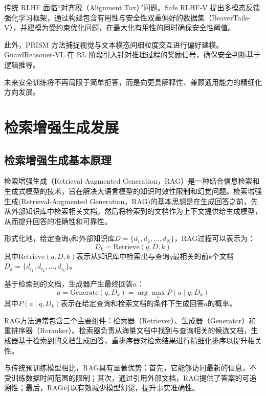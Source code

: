 传统 RLHF 面临“对齐税（Alignment Tax）”问题。Safe RLHF-V 提出多模态反馈强化学习框架，通过构建包含有用性与安全性双重偏好的数据集（BeaverTails-V），并建模为受约束优化问题，在最大化有用性的同时确保安全性阈值\supercite{DBLP:journals/corr/abs-2505-18531}。

此外，PRISM 方法捕捉视觉与文本模态间细粒度交互进行偏好建模\supercite{DBLP:journals/corr/abs-2508-18649}。GuardReasoner-VL 在 RL 阶段引入针对推理过程的奖励信号，确保安全判断基于逻辑推导\supercite{DBLP:conf/nips/ZouPWDLAKFH24}。

未来安全训练将不再局限于简单拒答，而是向更具解释性、兼顾通用能力的精细化方向发展。

\section{检索增强生成发展}
\subsection{检索增强生成基本原理}

检索增强生成（Retrieval-Augmented Generation，RAG）是一种结合信息检索和生成式模型的技术，旨在解决大语言模型的知识时效性限制和幻觉问题\supercite{DBLP:conf/nips/LewisPPPKGKLYR020}。检索增强生成(Retrieval-Augmented Generation，RAG)的基本思想是在生成回答之前，先从外部知识库中检索相关文档，然后将检索到的文档作为上下文提供给生成模型，从而提升回答的准确性和可靠性。

形式化地，给定查询$q$和外部知识库$D=\{d_1, d_2, \ldots, d_N\}$，RAG过程可以表示为：
\begin{equation}
D_k = \mathrm{Retrieve}(q, D, k)
\end{equation}
其中$\mathrm{Retrieve}(q, D, k)$表示从知识库中检索出与查询$q$最相关的前$k$个文档$D_k=\{d_{i_1}, d_{i_2}, \ldots, d_{i_k}\}$。

基于检索到的文档，生成器产生最终回答$a$：
\begin{equation}
a = \mathrm{Generate}(q, D_k) = \arg\max_a P(a \mid q, D_k)
\end{equation}
其中$P(a \mid q, D_k)$表示在给定查询和检索文档的条件下生成回答$a$的概率。

RAG方法通常包含三个主要组件：检索器（Retriever）、生成器（Generator）和重排序器（Reranker）。检索器负责从海量文档中找到与查询相关的候选文档，生成器基于检索到的文档生成回答，重排序器对检索结果进行精细化排序以提升相关性。

与传统预训练模型相比，RAG具有显著优势：首先，它能够访问最新的信息，不受训练数据时间范围的限制；其次，通过引用外部文档，RAG提供了答案的可追溯性；最后，RAG可以有效减少模型幻觉，提升事实准确性。

